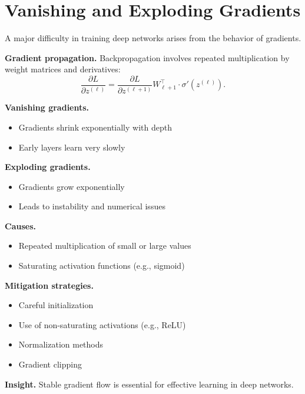 \section{Vanishing and Exploding Gradients}

A major difficulty in training deep networks arises from the behavior of gradients.

\medskip

\noindent
\textbf{Gradient propagation.}  
Backpropagation involves repeated multiplication by weight matrices and derivatives:
\[
\frac{\partial L}{\partial z^{(\ell)}} = \frac{\partial L}{\partial z^{(\ell+1)}} W_{\ell+1}^\top \cdot \sigma'(z^{(\ell)}).
\]

\medskip

\noindent
\textbf{Vanishing gradients.}
\begin{itemize}
    \item Gradients shrink exponentially with depth
    \item Early layers learn very slowly
\end{itemize}

\medskip

\noindent
\textbf{Exploding gradients.}
\begin{itemize}
    \item Gradients grow exponentially
    \item Leads to instability and numerical issues
\end{itemize}

\medskip

\noindent
\textbf{Causes.}
\begin{itemize}
    \item Repeated multiplication of small or large values
    \item Saturating activation functions (e.g., sigmoid)
\end{itemize}

\medskip

\noindent
\textbf{Mitigation strategies.}
\begin{itemize}
    \item Careful initialization
    \item Use of non-saturating activations (e.g., ReLU)
    \item Normalization methods
    \item Gradient clipping
\end{itemize}

\medskip

\noindent
\textbf{Insight.}  
Stable gradient flow is essential for effective learning in deep networks.

